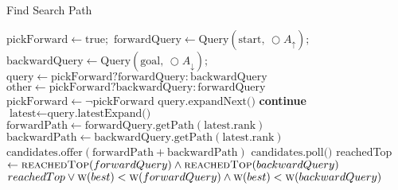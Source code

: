 \begin{algorithm}
    \caption{Find Search Path}
    \label{alg:cchSearch}
    \begin{algorithmic}[1]
        \State $\text{pickForward} \gets \text{true};$ 
        \State $\text{forwardQuery} \gets \text{Query}(\text{start, } \bigcirc A_\uparrow);$$\text{backwardQuery} \gets \text{Query}(\text{goal, } \bigcirc A_\downarrow);$
            \State $\text{query} \gets \text{pickForward} ? \text{forwardQuery} : \text{backwardQuery}$
            \State $\text{other} \gets \text{pickForward} ? \text{backwardQuery} : \text{forwardQuery}$
            \State $\text{pickForward} \gets \neg \text{pickForward}$
                 $\text{query.expandNext()}$
            \Else
                 \textbf{ continue}
            \EndIf            
            \State $\text{latest} \gets \text{query.latestExpand()}$
                \State $\text{forwardPath} \gets \text{forwardQuery.getPath}(\text{latest.rank})$
                \State $\text{backwardPath} \gets \text{backwardQuery.getPath}(\text{latest.rank})$
                \State $\text{candidates.offer}(\text{forwardPath} + \text{backwardPath})$
            \EndIf
        \EndWhile
        \State \Return $\text{candidates.poll()}$
    \EndFunction
    \State reachedTop $\gets \Call{reachedTop}{forwardQuery} \land \Call{reachedTop}{backwardQuery}$ 
    \State \Return $reachedTop  \lor \Call{w}{best} < \Call{w}{forwardQuery} \land \Call{w}{best} < \Call{w}{backwardQuery}$
    \EndFunction
    \end{algorithmic}
\end{algorithm}